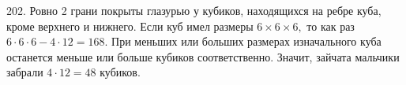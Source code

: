 202. Ровно 2 грани покрыты глазурью у кубиков, находящихся на ребре куба, кроме верхнего и нижнего. Если куб имел размеры $6\times6\times6,$ то как раз $6\cdot6\cdot6-4\cdot12=168.$ При меньших или больших размерах изначального куба останется меньше или больше кубиков соответственно. Значит, зайчата мальчики забрали $4\cdot12=48$ кубиков.\\
